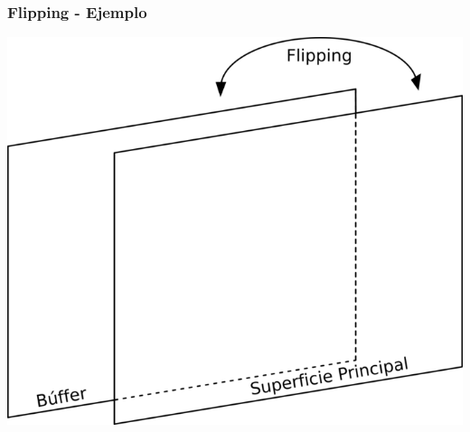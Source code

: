 \begin{frame}
    \frametitle{Flipping - Ejemplo}

    \begin{center}
		\includegraphics[scale=2]{img/flipping.png}
	\end{center}
    
\end{frame}
